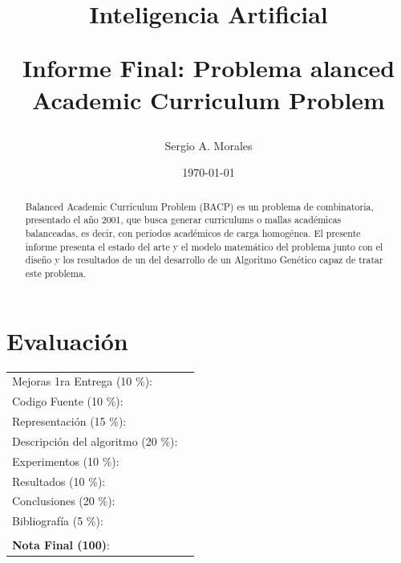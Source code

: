 \documentclass[letter, 10pt]{article}
\begin{document}
\title{Inteligencia Artificial \\ \begin{Large}Informe Final: Problema alanced Academic Curriculum Problem\end{Large}}
\author{Sergio A. Morales}
\date{\today}
\maketitle


\section*{Evaluación}

\begin{tabular}{ll}
Mejoras 1ra Entrega (10 \%): &  \underline{\hspace{2cm}}\\
Codigo Fuente (10 \%): &  \underline{\hspace{2cm}}\\
Representación (15 \%):  & \underline{\hspace{2cm}} \\
Descripción del algoritmo (20 \%):  & \underline{\hspace{2cm}} \\
Experimentos (10 \%):  & \underline{\hspace{2cm}} \\
Resultados (10 \%):  & \underline{\hspace{2cm}} \\
Conclusiones (20 \%): &  \underline{\hspace{2cm}}\\
Bibliografía (5 \%): & \underline{\hspace{2cm}}\\
 &  \\
\textbf{Nota Final (100)}:   & \underline{\hspace{2cm}}
\end{tabular}

\begin{abstract}
  Balanced Academic Curriculum Problem (BACP) es un problema de combinatoria,
  presentado el año 2001, que busca generar curriculums o mallas académicas
  balanceadas, es decir, con periodos académicos de carga homogénea. El presente
  informe presenta el estado del arte y el modelo matemático del problema junto
  con el diseño y los resultados de un del desarrollo de un Algoritmo Genético
  capaz de tratar este problema.
\end{abstract}
\end{document}
